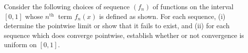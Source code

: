 \documentclass[answers]{exam}
\begin{document}
\begin{questions}
\question%
Consider the following choices of sequence $\left(f_{n}\right)$ of functions on the interval $[0,1]$ whose $n^{\text {th }}$ term $f_{n}(x)$ is defined as shown. For each sequence, (i) determine the pointwise limit or show that it fails to exist, and (ii) for each sequence which does converge pointwise, establish whether or not convergence is uniform on $[0,1]$.
\begin{parts}
\part%
$\left(\frac{x}{2}\right)^{n}$,

\part%
$\sin (n x)$,

\part%
$\frac{x}{1+n x^{2}}$,

\part%
$n^{2}(1-x) x^{n}$,

\part%
$\sqrt{n}(1-x) x^{n}$,

\part%
$\min \left\{x^{-1}, n\right\}$ for $x \in(0,1]$ and 0 for $x=0$.
\end{parts}



\question%
\end{questions}
\end{document}
